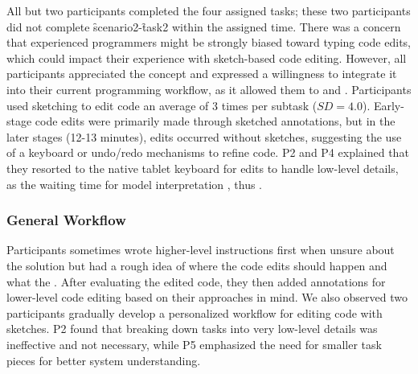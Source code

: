 All but two participants completed the four assigned tasks; these two participants did not complete \f{scenario2}-\f{task2} within the assigned time.
There was a concern that experienced programmers might be strongly biased toward typing code edits, which could impact their experience with sketch-based code editing. However, all participants appreciated the concept and expressed a willingness to integrate it into their current programming workflow, as it allowed them to  and .
Participants used sketching to edit code an average of 3 times per subtask ($SD=4.0$). 
Early-stage code edits were primarily made through sketched annotations, but in the later stages (12-13 minutes), edits occurred without sketches, suggesting the use of a keyboard or undo/redo mechanisms to refine code. P2 and P4 explained that they resorted to the native tablet keyboard for edits to handle low-level details, as the waiting time for model interpretation , thus .

\subsubsection{General Workflow} 
Participants sometimes wrote higher-level instructions first when unsure about the solution but had a rough idea of where the code edits should happen and what the . 
After evaluating the edited code, they then added annotations for lower-level code editing based on their approaches in mind.
We also observed two participants gradually develop a personalized workflow for editing code with sketches. P2 found that breaking down tasks into very low-level details was ineffective and not necessary, while P5 emphasized the need for smaller task pieces for better system understanding. 




